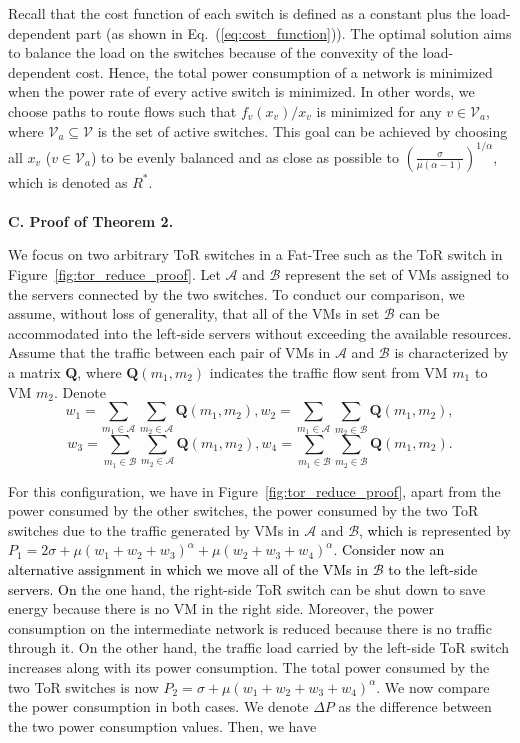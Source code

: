 \documentclass[journal,single-space,two column,twoside,10pt]{IEEEtran}
\begin{document}
Recall that the cost function of each switch is defined as a constant plus the load-dependent part (as shown in Eq.~(\ref{eq:cost_function})). The optimal solution aims to balance the load on the switches because of the convexity of the load-dependent cost.
Hence, the total power consumption of a network is minimized when the power rate of every active switch is minimized. In other words, we choose paths to route flows such that
$f_v(x_v)/x_v$ is minimized for any $v \in \mathcal{V}_a$, where $\mathcal{V}_a \subseteq \mathcal{V}$ is the set of active switches.
This goal can be achieved by choosing all $x_v$ ($v \in \mathcal{V}_a$) to be evenly balanced and as close as possible to $\left(\frac{\sigma}{\mu(\alpha-1)}\right)^{1/\alpha}$, which is denoted as $R^*$.
\\\\
\noindent\textbf{C. Proof of Theorem 2.}

We focus on two arbitrary ToR switches in a Fat-Tree such as the ToR switch in Figure~\ref{fig:tor_reduce_proof}. Let $\mathcal{A}$ and $\mathcal{B}$ represent the set of VMs assigned to the servers connected by the two switches. To conduct our comparison, we assume, without loss of generality, that all of the VMs in set $\mathcal{B}$ can be accommodated into the left-side servers without
exceeding the available resources. Assume that the traffic between each pair of VMs in $\mathcal{A}$ and $\mathcal{B}$ is characterized by a matrix $\mathbf{Q}$, where $\mathbf{Q}(m_1,m_2)$ indicates the traffic flow sent from VM $m_1$ to VM $m_2$. Denote
$$w_1 =  \sum_{m_1 \in \mathcal{A}}\sum_{m_2 \in \mathcal{A}} \mathbf{Q}(m_1,m_2), w_2 = \sum_{m_1 \in \mathcal{A}}\sum_{m_2 \in \mathcal{B}} \mathbf{Q}(m_1,m_2),$$
$$w_3 = \sum_{m_1 \in \mathcal{B}}\sum_{m_2 \in \mathcal{A}} \mathbf{Q}(m_1,m_2), w_4 = \sum_{m_1 \in \mathcal{B}}\sum_{m_2 \in \mathcal{B}} \mathbf{Q}(m_1,m_2).$$

For this configuration, we have in Figure~\ref{fig:tor_reduce_proof}, apart from the power consumed by the other switches, the power consumed by the two ToR switches due to the traffic generated by VMs in $\mathcal{A}$ and $\mathcal{B}$, \textcolor{black}{which} is represented by
$P_1 = 2 \sigma + \mu ( w_1 + w_2 + w_3 )^{\alpha} + \mu (w_2 + w_3 + w_4)^{\alpha}$.
\textcolor{black}{Consider now an alternative assignment in which we move all of the VMs in $\mathcal{B}$ to the left-side servers. On} the one hand, the right-side ToR switch can be shut down to save energy because there is no VM in the right side. Moreover, the power consumption on the intermediate network is reduced because there is no traffic through it. On the other hand, the traffic load carried by the left-side ToR switch increases along with its power consumption. The total power consumed by the two ToR switches is now
$P_2 = \sigma + \mu (w_1 + w_2 + w_3 + w_4)^{\alpha}$.
We now compare the power consumption in both cases. We denote $\Delta P$ as the difference between the two power consumption values. Then, we have
\end{document}
